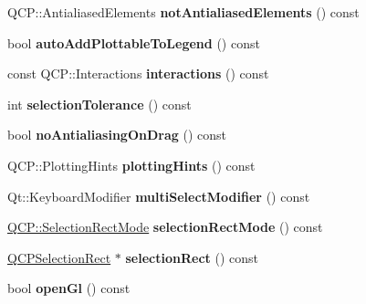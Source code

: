 \begin{DoxyCompactItemize}
\mbox{\label{class_q_custom_plot_a75571bc5b2167e83def132fc993091b3}} 
Q\+C\+P\+::\+Antialiased\+Elements {\bfseries not\+Antialiased\+Elements} () const
\item 
\mbox{\label{class_q_custom_plot_ac4b87de13eaceadc8db5a66654197689}} 
bool {\bfseries auto\+Add\+Plottable\+To\+Legend} () const
\item 
\mbox{\label{class_q_custom_plot_a2c78c5fd2943c148ab76652801d3f2dc}} 
const Q\+C\+P\+::\+Interactions {\bfseries interactions} () const
\item 
\mbox{\label{class_q_custom_plot_a5441d11013afeaf4b8f2ea06e8624a25}} 
int {\bfseries selection\+Tolerance} () const
\item 
\mbox{\label{class_q_custom_plot_aca3f01f903fb250a3dd27104d92830be}} 
bool {\bfseries no\+Antialiasing\+On\+Drag} () const
\item 
\mbox{\label{class_q_custom_plot_ac724f4075822f74f7b676a790095b877}} 
Q\+C\+P\+::\+Plotting\+Hints {\bfseries plotting\+Hints} () const
\item 
\mbox{\label{class_q_custom_plot_a28182402ed11609c9a429f0788162d18}} 
Qt\+::\+Keyboard\+Modifier {\bfseries multi\+Select\+Modifier} () const
\item 
\mbox{\label{class_q_custom_plot_a6e53c402de2770a978dffa5584c05b27}} 
\hyperlink{namespace_q_c_p_ac9aa4d6d81ac76b094f9af9ad2d3aacf}{Q\+C\+P\+::\+Selection\+Rect\+Mode} {\bfseries selection\+Rect\+Mode} () const
\item 
\mbox{\label{class_q_custom_plot_af847f916ada725a1e9fb4a1598bf3f38}} 
\hyperlink{class_q_c_p_selection_rect}{Q\+C\+P\+Selection\+Rect} $\ast$ {\bfseries selection\+Rect} () const
\item 
\mbox{\label{class_q_custom_plot_abe5556ac80dc0140fd57f2b2f94a1f0e}} 
bool {\bfseries open\+Gl} () const
\item 
\mbox{\label{class_q_custom_plot_a3f9bc4b939dd8aaba9339fd09f273fc4}} 

\end{DoxyCompactItemize}
